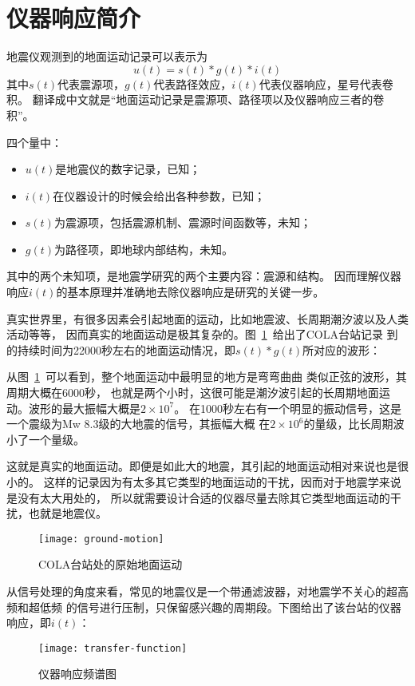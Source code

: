\section{仪器响应简介}
地震仪观测到的地面运动记录可以表示为
\[  u(t) = s(t) * g(t) * i(t) \]
其中$s(t)$代表震源项，$g(t)$代表路径效应，$i(t)$代表仪器响应，星号代表卷积。
翻译成中文就是``地面运动记录是震源项、路径项以及仪器响应三者的卷积''。

四个量中：
\begin{itemize}
\item $u(t)$是地震仪的数字记录，已知；
\item $i(t)$在仪器设计的时候会给出各种参数，已知；
\item $s(t)$为震源项，包括震源机制、震源时间函数等，未知；
\item $g(t)$为路径项，即地球内部结构，未知。
\end{itemize}
其中的两个未知项，是地震学研究的两个主要内容：震源和结构。
因而理解仪器响应$i(t)$的基本原理并准确地去除仪器响应是研究的关键一步。

真实世界里，有很多因素会引起地面的运动，比如地震波、长周期潮汐波以及人类活动等等，
因而真实的地面运动是极其复杂的。图~\ref{fig:ground-motion}~给出了COLA台站记录
到的持续时间为22000秒左右的地面运动情况，即$s(t)*g(t)$所对应的波形：

从图~\ref{fig:ground-motion}~可以看到，整个地面运动中最明显的地方是弯弯曲曲
类似正弦的波形，其周期大概在6000秒，
也就是两个小时，这很可能是潮汐波引起的长周期地面运动。波形的最大振幅大概是$2\times10^7$。
在1000秒左右有一个明显的振动信号，这是一个震级为Mw 8.3级的大地震的信号，其振幅大概
在$2\times10^6$的量级，比长周期波小了一个量级。

这就是真实的地面运动。即便是如此大的地震，其引起的地面运动相对来说也是很小的。
这样的记录因为有太多其它类型的地面运动的干扰，因而对于地震学来说是没有太大用处的，
所以就需要设计合适的仪器尽量去除其它类型地面运动的干扰，也就是地震仪。

\begin{figure}[H]
\centering
\texttt{[image: ground-motion]}
\caption{COLA台站处的原始地面运动}
\label{fig:ground-motion}
\end{figure}

从信号处理的角度来看，常见的地震仪是一个带通滤波器，对地震学不关心的超高频和超低频
的信号进行压制，只保留感兴趣的周期段。下图给出了该台站的仪器响应，即$i(t)$：

\begin{figure}[H]
\centering
\texttt{[image: transfer-function]}
\caption{仪器响应频谱图}
\label{fig:transfer-function}
\end{figure}

